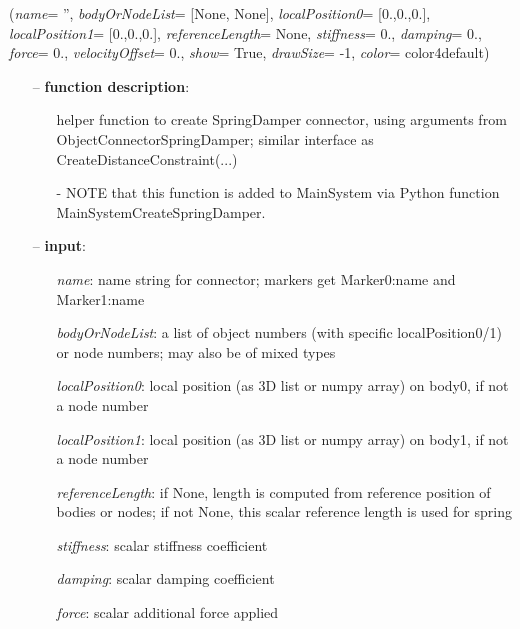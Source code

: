 %
\begin{flushleft}
\label{sec:mainsystemextensions:CreateSpringDamper}
({\it name}= '', {\it bodyOrNodeList}= [None, None], {\it localPosition0}= [0.,0.,0.], {\it localPosition1}= [0.,0.,0.], {\it referenceLength}= None, {\it stiffness}= 0., {\it damping}= 0., {\it force}= 0., {\it velocityOffset}= 0., {\it show}= True, {\it drawSize}= -1, {\it color}= color4default)
\end{flushleft}
\setlength{\itemindent}{0.7cm}
\begin{itemize}[leftmargin=0.7cm]
\item[--]
{\bf function description}: \vspace{-6pt}
\begin{itemize}[leftmargin=1.2cm]
\setlength{\itemindent}{-0.7cm}
\item[]helper function to create SpringDamper connector, using arguments from ObjectConnectorSpringDamper; similar interface as CreateDistanceConstraint(...)
\item[]- NOTE that this function is added to MainSystem via Python function MainSystemCreateSpringDamper.
\end{itemize}
\item[--]
{\bf input}: \vspace{-6pt}
\begin{itemize}[leftmargin=1.2cm]
\setlength{\itemindent}{-0.7cm}
\item[]{\it name}: name string for connector; markers get Marker0:name and Marker1:name
\item[]{\it bodyOrNodeList}: a list of object numbers (with specific localPosition0/1) or node numbers; may also be of mixed types
\item[]{\it localPosition0}: local position (as 3D list or numpy array) on body0, if not a node number
\item[]{\it localPosition1}: local position (as 3D list or numpy array) on body1, if not a node number
\item[]{\it referenceLength}: if None, length is computed from reference position of bodies or nodes; if not None, this scalar reference length is used for spring
\item[]{\it stiffness}: scalar stiffness coefficient
\item[]{\it damping}: scalar damping coefficient
\item[]{\it force}: scalar additional force applied

\end{itemize}
\end{itemize}
